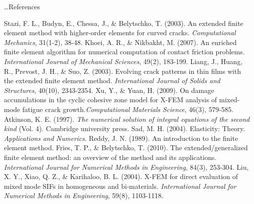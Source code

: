 \documentclass{beamer}
\begin{document}
\begin{frame}[t,fragile]{\ldots References}
    \tiny
\begin{thebibliography}{10}
      Stazi, F. L., Budyn, E., Chessa, J., \& Belytschko, T. (2003). An extended finite element method with higher-order elements for curved cracks. \emph{Computational Mechanics}, 31(1-2), 38-48.
      Khoei, A. R., \& Nikbakht, M. (2007). An enriched finite element algorithm for numerical computation of contact friction problems. \emph{International Journal of Mechanical Sciences}, 49(2), 183-199.
      Liang, J., Huang, R., Prevost, J. H., \& Suo, Z. (2003). Evolving crack patterns in thin films with the extended finite element method. \emph{International Journal of Solids and Structures}, 40(10), 2343-2354.
      Xu, Y., \& Yuan, H. (2009). On damage accumulations in the cyclic cohesive zone model for X-FEM analysis of mixed-mode fatigue crack growth.\emph{Computational Materials Science}, 46(3), 579-585.
      Atkinson, K. E. (1997). \emph{The numerical solution of integral equations of the second kind} (Vol. 4). Cambridge university press.
     Sad, M. H. (2004). Elasticity: Theory. \emph{Applications and Numerics}. 
     Reddy, J. N. (1989). An introduction to the finite element method.
     Fries, T. P., \& Belytschko, T. (2010). The extended/generalized finite element method: an overview of the method and its applications. \emph{International Journal for Numerical Methods in Engineering}, 84(3), 253-304.
     Liu, X. Y., Xiao, Q. Z., \& Karihaloo, B. L. (2004). X-FEM for direct evaluation of mixed mode SIFs in homogeneous and bi‐materials. \emph{International Journal for Numerical Methods in Engineering}, 59(8), 1103-1118.
\end{thebibliography}
\end{frame}
\end{document}
